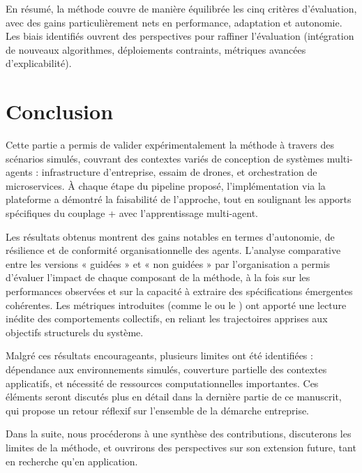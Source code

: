 \medskip
En résumé, la méthode  couvre de manière équilibrée les cinq critères d’évaluation, avec des gains particulièrement nets en performance, adaptation et autonomie. Les biais identifiés ouvrent des perspectives pour raffiner l’évaluation (intégration de nouveaux algorithmes, déploiements contraints, métriques avancées d’explicabilité).

\clearpage
\thispagestyle{empty}
\null
\newpage


\chapter*{Conclusion}

Cette partie a permis de valider expérimentalement la méthode  à travers des scénarios simulés, couvrant des contextes variés de conception de systèmes multi-agents : infrastructure d’entreprise, essaim de drones, et orchestration de microservices. À chaque étape du pipeline proposé, l’implémentation via la plateforme  a démontré la faisabilité de l’approche, tout en soulignant les apports spécifiques du couplage + avec l’apprentissage multi-agent.

Les résultats obtenus montrent des gains notables en termes d’autonomie, de résilience et de conformité organisationnelle des agents. L’analyse comparative entre les versions « guidées » et « non guidées » par l’organisation a permis d’évaluer l’impact de chaque composant de la méthode, à la fois sur les performances observées et sur la capacité à extraire des spécifications émergentes cohérentes. Les métriques introduites (comme le  ou le ) ont apporté une lecture inédite des comportements collectifs, en reliant les trajectoires apprises aux objectifs structurels du système.

Malgré ces résultats encourageants, plusieurs limites ont été identifiées : dépendance aux environnements simulés, couverture partielle des contextes applicatifs, et nécessité de ressources computationnelles importantes. Ces éléments seront discutés plus en détail dans la dernière partie de ce manuscrit, qui propose un retour réflexif sur l’ensemble de la démarche entreprise.

\vspace{1em}

\noindent
Dans la suite, nous procéderons à une synthèse des contributions, discuterons les limites de la méthode, et ouvrirons des perspectives sur son extension future, tant en recherche qu’en application.
